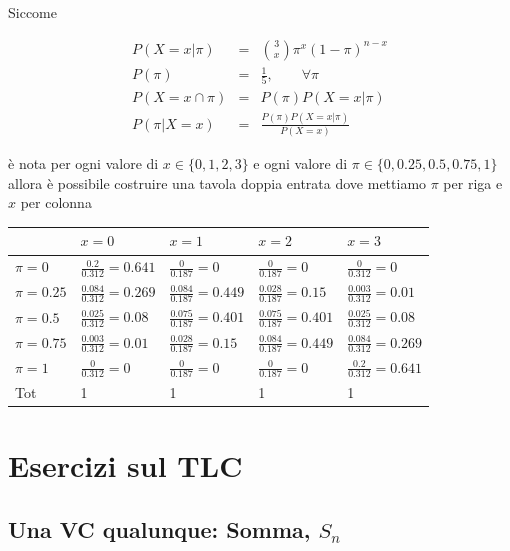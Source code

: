 \documentclass[
  11pt,
]{book}
\theoremstyle{mytheoremstyle}
\theoremstyle{mydefstyle}
\newenvironment{sol}
  {
  \begin{tcolorbox}[enhanced,breakable,arc=0.1mm,boxrule=1pt,colback=white,colframe=iblue,
  title=\bf \fontfamily{lmss}\selectfont \hspace{.5 cm} Soluzione,drop fuzzy shadow]

}{
\end{tcolorbox}
  }
\begin{document}
\begin{sol}

Siccome

\begin{eqnarray*}
  P(X=x|\pi) &=&  \binom{3}{x}\pi^x(1-\pi)^{n-x}\\
  P(\pi)      &=& \frac 15,\qquad \forall \pi\\
  P(X=x\cap\pi) &=& P(\pi)P(X=x|\pi)\\
  P(\pi|X=x) &=& \frac{P(\pi)P(X=x|\pi)}{P(X=x)}
\end{eqnarray*}

è nota per ogni valore di \(x\in\{0,1,2,3\}\) e ogni valore di \(\pi\in\{0,0.25,0.5,0.75,1\}\) allora è possibile costruire una
tavola doppia entrata dove mettiamo \(\pi\) per riga e \(x\) per colonna

\begin{tabular}{lllll}
\toprule
  & $x=0$ & $x=1$ & $x=2$ & $x=3$\\
\midrule
$\pi=0$ & $\frac{0.2}{0.312}=0.641$ & $\frac{0}{0.187}=0$ & $\frac{0}{0.187}=0$ & $\frac{0}{0.312}=0$\\
$\pi=0.25$ & $\frac{0.084}{0.312}=0.269$ & $\frac{0.084}{0.187}=0.449$ & $\frac{0.028}{0.187}=0.15$ & $\frac{0.003}{0.312}=0.01$\\
$\pi=0.5$ & $\frac{0.025}{0.312}=0.08$ & $\frac{0.075}{0.187}=0.401$ & $\frac{0.075}{0.187}=0.401$ & $\frac{0.025}{0.312}=0.08$\\
$\pi=0.75$ & $\frac{0.003}{0.312}=0.01$ & $\frac{0.028}{0.187}=0.15$ & $\frac{0.084}{0.187}=0.449$ & $\frac{0.084}{0.312}=0.269$\\
$\pi=1$ & $\frac{0}{0.312}=0$ & $\frac{0}{0.187}=0$ & $\frac{0}{0.187}=0$ & $\frac{0.2}{0.312}=0.641$\\
Tot & 1 & 1 & 1 & 1\\
\bottomrule
\end{tabular}

\end{sol}

\chapter{Esercizi sul TLC}\label{esercizi-sul-tlc}

\section{\texorpdfstring{Una VC qualunque: Somma, \(S_{n}\)}{Una VC qualunque: Somma, S\_\{n\}}}\label{una-vc-qualunque-somma-s_n}
\end{document}
